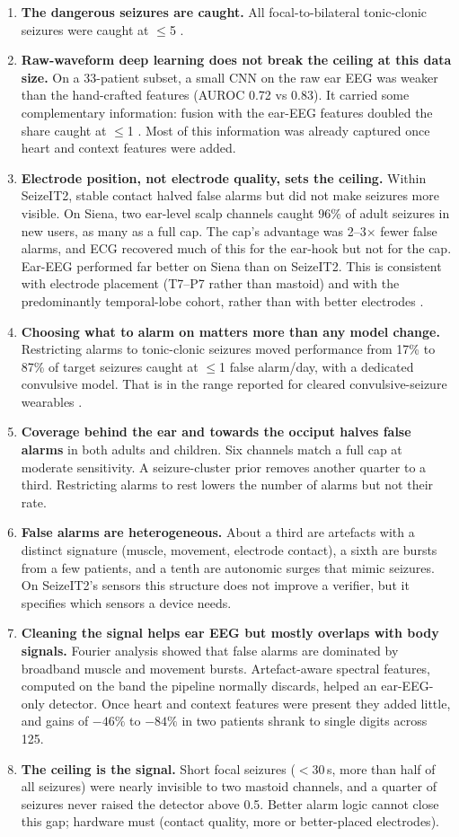 \begin{enumerate}
\item \textbf{The dangerous seizures are caught.} All focal-to-bilateral tonic-clonic seizures were caught at $\le$5 \FAd.
\item \textbf{Raw-waveform deep learning does not break the ceiling at this data size.} On a 33-patient subset, a small CNN on the raw ear EEG was weaker than the hand-crafted features (AUROC 0.72 vs 0.83). It carried some complementary information: fusion with the ear-EEG features doubled the share caught at $\le$1 \FAd. Most of this information was already captured once heart and context features were added.
\item \textbf{Electrode position, not electrode quality, sets the ceiling.} Within SeizeIT2, stable contact halved false alarms but did not make seizures more visible. On Siena, two ear-level scalp channels caught 96\% of adult seizures in new users, as many as a full cap. The cap's advantage was 2--3$\times$ fewer false alarms, and ECG recovered much of this for the ear-hook but not for the cap. Ear-EEG performed far better on Siena than on SeizeIT2. This is consistent with electrode placement (T7--P7 rather than mastoid) and with the predominantly temporal-lobe cohort, rather than with better electrodes \cite{gu2018}.
\item \textbf{Choosing what to alarm on matters more than any model change.} Restricting alarms to tonic-clonic seizures moved performance from 17\% to 87\% of target seizures caught at $\le$1 false alarm/day, with a dedicated convulsive model. That is in the range reported for cleared convulsive-seizure wearables \cite{onorati2017,beniczky2021}.
\item \textbf{Coverage behind the ear and towards the occiput halves false alarms} in both adults and children. Six channels match a full cap at moderate sensitivity. A seizure-cluster prior removes another quarter to a third. Restricting alarms to rest lowers the number of alarms but not their rate.
\item \textbf{False alarms are heterogeneous.} About a third are artefacts with a distinct signature (muscle, movement, electrode contact), a sixth are bursts from a few patients, and a tenth are autonomic surges that mimic seizures. On SeizeIT2's sensors this structure does not improve a verifier, but it specifies which sensors a device needs.
\item \textbf{Cleaning the signal helps ear EEG but mostly overlaps with body signals.} Fourier analysis showed that false alarms are dominated by broadband muscle and movement bursts. Artefact-aware spectral features, computed on the band the pipeline normally discards, helped an ear-EEG-only detector. Once heart and context features were present they added little, and gains of $-46\%$ to $-84\%$ in two patients shrank to single digits across 125.
\item \textbf{The ceiling is the signal.} Short focal seizures ($<$30\,s, more than half of all seizures) were nearly invisible to two mastoid channels, and a quarter of seizures never raised the detector above 0.5. Better alarm logic cannot close this gap; hardware must (contact quality, more or better-placed electrodes).
\end{enumerate}

